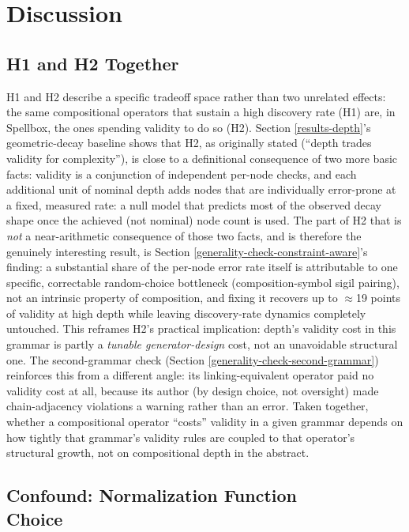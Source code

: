 \documentclass[]{article}
\begin{document}
    \section{Discussion}\label{discussion}

        \subsection{H1 and H2 Together}\label{h1+h2}

        H1 and H2 describe a specific tradeoff space rather than two unrelated effects: the same compositional operators that sustain a high discovery rate (H1) are, in Spellbox, the ones spending validity to do so (H2). Section \ref{results-depth}'s geometric-decay baseline shows that H2, as originally stated (``depth trades validity for complexity''), is close to a definitional consequence of two more basic facts: validity is a conjunction of independent per-node checks, and each additional unit of nominal depth adds nodes that are individually error-prone at a fixed, measured rate: a null model that predicts most of the observed decay shape once the achieved (not nominal) node count is used. The part of H2 that is \textit{not} a near-arithmetic consequence of those two facts, and is therefore the genuinely interesting result, is Section \ref{generality-check-constraint-aware}'s finding: a substantial share of the per-node error rate itself is attributable to one specific, correctable random-choice bottleneck (composition-symbol sigil pairing), not an intrinsic property of composition, and fixing it recovers up to $\approx$19 points of validity at high depth while leaving discovery-rate dynamics completely untouched. This reframes H2's practical implication: depth's validity cost in this grammar is partly a \textit{tunable generator-design} cost, not an unavoidable structural one. The second-grammar check (Section \ref{generality-check-second-grammar}) reinforces this from a different angle: its linking-equivalent operator paid no validity cost at all, because its author (by design choice, not oversight) made chain-adjacency violations a warning rather than an error. Taken together, whether a compositional operator ``costs'' validity in a given grammar depends on how tightly that grammar's validity rules are coupled to that operator's structural growth, not on compositional depth in the abstract.

        \subsection{Confound: Normalization Function \\ Choice}\label{normalization-function}
\end{document}
